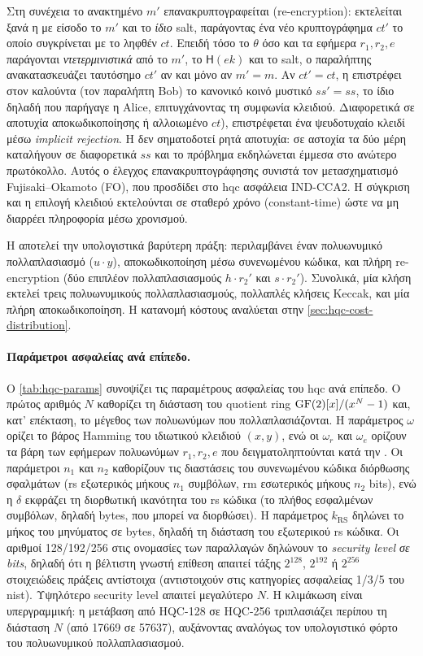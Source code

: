 Στη συνέχεια το ανακτημένο $m'$ επανακρυπτογραφείται (re-encryption): 
εκτελείται ξανά η \Encaps με είσοδο το $m'$ και το \emph{ίδιο} salt, 
παράγοντας ένα νέο κρυπτογράφημα $ct'$ 
το οποίο συγκρίνεται με το ληφθέν $ct$. Επειδή τόσο το $\theta$ όσο 
και τα εφήμερα $r_1, r_2, e$ παράγονται \emph{ντετερμινιστικά} από το 
$m'$, το $\mathsf{H}(ek)$ και το salt, ο παραλήπτης ανακατασκευάζει 
ταυτόσημο $ct'$ αν και μόνο αν $m' = m$. Αν $ct' = ct$, η \Decaps 
επιστρέφει στον καλούντα (τον παραλήπτη Bob) το κανονικό κοινό μυστικό 
$ss' = ss$, το ίδιο δηλαδή που παρήγαγε η Alice, επιτυγχάνοντας τη 
συμφωνία κλειδιού. Διαφορετικά σε αποτυχία αποκωδικοποίησης ή αλλοιωμένο 
$ct$), επιστρέφεται ένα ψευδοτυχαίο κλειδί μέσω \emph{implicit rejection}. 
Η \Decaps δεν σηματοδοτεί 
ρητά αποτυχία: σε αστοχία τα δύο μέρη καταλήγουν σε διαφορετικά $ss$ 
και το πρόβλημα εκδηλώνεται έμμεσα στο ανώτερο πρωτόκολλο.
Αυτός ο έλεγχος επανακρυπτογράφησης συνιστά τον μετασχηματισμό 
Fujisaki–Okamoto (FO), που προσδίδει στο \gls{hqc} ασφάλεια IND-CCA2.
Η σύγκριση και η επιλογή κλειδιού εκτελούνται σε σταθερό χρόνο (constant-time) ώστε να μη διαρρέει πληροφορία μέσω χρονισμού.

Η \Decaps αποτελεί την υπολογιστικά βαρύτερη πράξη: περιλαμβάνει έναν
πολυωνυμικό πολλαπλασιασμό ($u \cdot y$), αποκωδικοποίηση μέσω συνενωμένου
κώδικα, και πλήρη re-encryption (δύο επιπλέον πολλαπλασιασμούς $h \cdot r_2'$
και $s \cdot r_2'$).
Συνολικά, μία κλήση \Decaps εκτελεί τρεις πολυωνυμικούς πολλαπλασιασμούς,
πολλαπλές κλήσεις Keccak, και μία πλήρη αποκωδικοποίηση. Η κατανομή κόστους
αναλύεται στην \cref{sec:hqc-cost-distribution}.


\paragraph{Παράμετροι ασφαλείας ανά επίπεδο.}
Ο \cref{tab:hqc-params} συνοψίζει τις παραμέτρους ασφαλείας του \gls{hqc} ανά
επίπεδο.
Ο πρώτος αριθμός $N$ καθορίζει τη διάσταση του quotient ring $\mathrm{GF}(2)[x]/(x^{N}-1)$
και, κατ' επέκταση, το μέγεθος των πολυωνύμων που πολλαπλασιάζονται.
Η παράμετρος $\omega$ ορίζει το βάρος Hamming του ιδιωτικού κλειδιού $(x, y)$,
ενώ οι $\omega_r$ και $\omega_e$ ορίζουν τα βάρη των εφήμερων πολυωνύμων
$r_1, r_2, e$ που δειγματοληπτούνται κατά την \Encaps.
Οι παράμετροι $n_1$ και $n_2$ καθορίζουν τις διαστάσεις του συνενωμένου κώδικα
διόρθωσης σφαλμάτων (\gls{rs} εξωτερικός μήκους $n_1$ συμβόλων, \gls{rm}
εσωτερικός μήκους $n_2$ bits), ενώ η $\delta$ εκφράζει τη διορθωτική ικανότητα
του \gls{rs} κώδικα (το πλήθος εσφαλμένων συμβόλων, δηλαδή bytes, που μπορεί να διορθώσει).
Η παράμετρος $k_{\mathrm{RS}}$ δηλώνει το μήκος του μηνύματος σε bytes, δηλαδή τη διάσταση του εξωτερικού \gls{rs} κώδικα.
Οι αριθμοί 128/192/256 στις ονομασίες των παραλλαγών δηλώνουν το \emph{security level σε bits}, δηλαδή ότι η βέλτιστη γνωστή επίθεση απαιτεί τάξης $2^{128}$, $2^{192}$ ή $2^{256}$ στοιχειώδεις πράξεις αντίστοιχα (αντιστοιχούν στις κατηγορίες ασφαλείας 1/3/5 του \gls{nist}). Υψηλότερο security level απαιτεί μεγαλύτερο $N$. Η κλιμάκωση είναι υπεργραμμική: η μετάβαση από HQC-128 σε HQC-256 τριπλασιάζει
περίπου τη διάσταση $N$ (από \num{17669} σε \num{57637}), αυξάνοντας αναλόγως
τον υπολογιστικό φόρτο του πολυωνυμικού πολλαπλασιασμού.

